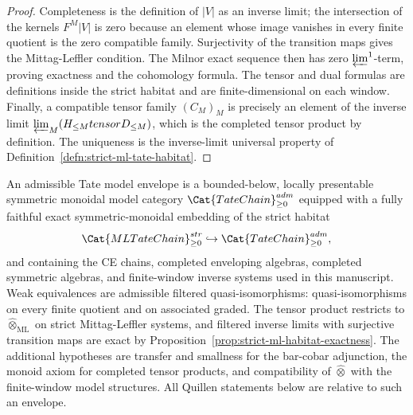 \begin{proof}
  Completeness is the definition of \(|V|\) as an inverse limit; the
  intersection of the kernels \(F^M|V|\) is zero because an element whose
  image vanishes in every finite quotient is the zero compatible family.
  Surjectivity of the transition maps gives the Mittag-Leffler condition.
  The Milnor exact sequence then has zero \(\varprojlim^1\)-term, proving
  exactness and the cohomology formula.  The tensor and dual formulas are
  definitions inside the strict habitat and are finite-dimensional on each
  window.  Finally, a compatible tensor family \((C_M)_M\) is precisely an
  element of the inverse limit
  \(\varprojlim_M(H_{\leq M}\otimes D_{\leq M})\), which is the completed
  tensor product by definition.  The uniqueness is the inverse-limit
  universal property of Definition~\ref{defn:strict-ml-tate-habitat}.
\end{proof}

\begin{stmt}\label{stmt:tate-model-envelope}
  An admissible Tate model envelope is a bounded-below, locally
  presentable symmetric monoidal model category
  \(\Cat{TateChain}_{\geq0}^{\mathrm{adm}}\) equipped with a fully
  faithful exact symmetric-monoidal embedding of the strict habitat
  \[
    \Cat{MLTateChain}_{\geq0}^{\mathrm{str}}
      \hookrightarrow
    \Cat{TateChain}_{\geq0}^{\mathrm{adm}},
  \]
  and containing the CE chains, completed enveloping algebras, completed
  symmetric algebras, and finite-window inverse systems used in this
  manuscript.  Weak equivalences are admissible filtered
  quasi-isomorphisms: quasi-isomorphisms on every finite quotient and on
  associated graded.  The tensor product restricts to
  \(\widehat\otimes_{\mathrm{ML}}\) on strict Mittag-Leffler systems, and
  filtered inverse limits with surjective transition maps are exact by
  Proposition~\ref{prop:strict-ml-habitat-exactness}.  The additional
  hypotheses are transfer and smallness for the bar-cobar adjunction, the
  monoid axiom for completed tensor products, and compatibility of
  \(\widehat\otimes\) with the finite-window model structures.  All
  Quillen statements below are relative to such an envelope.
\end{stmt}

